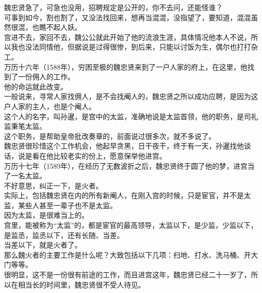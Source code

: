 \begin{multicols}{\theparacolNo}
魏忠贤急了，可急也没用，招聘规定是公开的，你不去问，还能怪谁？\\

可事到如今，割也割了，又没法找回来，想再当混混，没指望了，要知道，混混虽然很混，也瞧不起人妖。\\

宫进不去，家回不去，魏公公就此开始了他的流浪生涯，具体情况他本人不说，所以我也没法同情他，但据说是过得很惨，到后来，只能以讨饭为生，偶尔也打打杂工。\\

万历十六年（1588年），穷困至极的魏忠贤来到了一户人家的府上，在这里，他找到了一份佣人的工作。\\

他的命运就此改变。\\

一般说来，寻常人家找佣人，是不会找阉人的，魏忠贤之所以成功应聘，是因为这户人家的主人，也是个阉人。\\

这个人的名字，叫孙暹，是宫中的太监，准确地说是太监首领，他的职务，是司礼监秉笔太监。\\

这个职务，是帮助皇帝批改奏章的，前面说过很多次，就不多说了。\\

魏忠贤很珍惜这个工作机会，他起早贪黑，日干夜干，终于有一天，孙暹找他谈话，说是看在他比较老实的份上，愿意保举他进宫。\\

万历十七年（1589年），在经历了无数波折之后，魏忠贤终于圆了他的梦，进宫当了一名太监。\\

不好意思，纠正一下，是火者。\\

实际上，包括魏忠贤在内的所有新阉人，在刚入宫的时候，只是宦官，并不是太监，某些人甚至一辈子也不是太监。\\

因为太监，是很难当上的。\\

宫里，能被称为“太监”的，都是宦官的最高领导，太监以下，是少监，少监以下，是监丞，监丞以下，还有长随、当差。\\

当差以下，就是火者了。\\

那么魏火者的主要工作是什么呢？大致包括以下几项：扫地、打水、洗马桶、开大门等等。\\

很明显，这不是一份很有前途的工作，而且进宫这年，魏忠贤已经二十一岁了，所以在相当长的时间里，魏忠贤很不受人待见。\\


\end{multicols}

